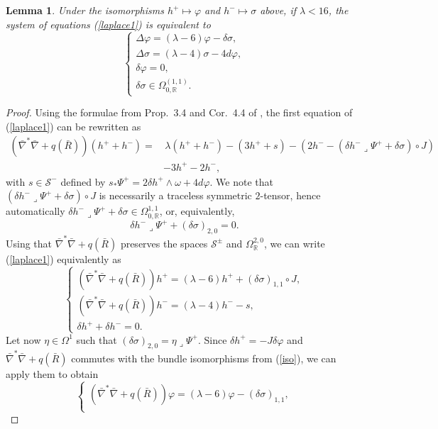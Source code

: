 \documentclass[12pt]{scrartcl}
\theoremstyle{plain}
\newtheorem{lem}[satz]{Lemma}
\theoremstyle{definition}
\newcommand{\R}{\mathbb{R}}%
\renewcommand{\S}{\mathscr{S}}%
\begin{document}
\begin{lem}\label{equivsystem}
Under the isomorphisms $h^+\mapsto\varphi$ and $h^-\mapsto\sigma$ above, if $\lambda<16$, the system of equations {\upshape(\ref{laplace1})} is equivalent to
\begin{equation}
\begin{cases}
\Delta\varphi=(\lambda-6)\varphi-\delta\sigma,\\
\Delta\sigma=(\lambda-4)\sigma-4d\varphi,\\
\delta\varphi=0,\\
\delta\sigma\in\Omega^{(1,1)}_{0,\R}.
\end{cases}\tag{L2}\label{laplacesystem}
\end{equation}
\end{lem}

\begin{proof}
Using the formulae from Prop.~3.4 and Cor.~4.4 of \cite{nearlykaehler}, the first equation of (\ref{laplace1}) can be rewritten as
\begin{align*}
(\bar\nabla^\ast\bar\nabla+q(\bar R))(h^++h^-)=&\,\lambda(h^++h^-)-(3h^++s)-(2h^--(\delta h^-\lrcorner\Psi^++\delta\sigma)\circ J)\\
&-3h^+-2h^-,
\end{align*}
with $s\in\S^-$ defined by $s_\ast\Psi^+=2\delta h^+\wedge\omega+4d\varphi$. We note that $(\delta h^-\lrcorner\Psi^++\delta\sigma)\circ J$ is necessarily a traceless symmetric $2$-tensor, hence automatically $\delta h^-\lrcorner\Psi^++\delta\sigma\in\Omega^{1,1}_{0,\R}$, or, equivalently,
\[\delta h^-\lrcorner\Psi^++(\delta\sigma)_{2,0}=0.\]
Using that $\bar\nabla^\ast\bar\nabla+q(\bar R)$ preserves the spaces $\S^\pm$ and $\Omega^{2,0}_\R$, we can write (\ref{laplace1}) equivalently as
\[\begin{cases}
   (\bar\nabla^\ast\bar\nabla+q(\bar R))h^+=(\lambda-6)h^++(\delta\sigma)_{1,1}\circ J,\\
   (\bar\nabla^\ast\bar\nabla+q(\bar R))h^-=(\lambda-4)h^--s,\\
   \delta h^++\delta h^-=0.
  \end{cases}\]
Let now $\eta\in\Omega^1$ such that $(\delta\sigma)_{2,0}=\eta\lrcorner\Psi^+$. Since $\delta h^+=-J\delta\varphi$ and $\bar\nabla^\ast\bar\nabla+q(\bar R)$ commutes with the bundle isomorphisms from (\ref{iso}), we can apply them to obtain
\[\begin{cases}
   (\bar\nabla^\ast\bar\nabla+q(\bar R))\varphi=(\lambda-6)\varphi-(\delta\sigma)_{1,1},\\

\end{cases}\]
\end{proof}
\end{document}
